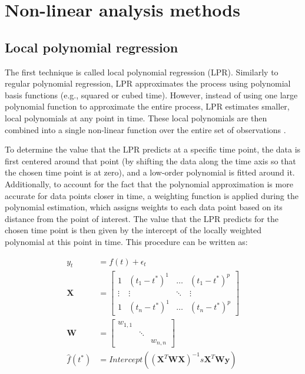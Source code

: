 \documentclass[man, floatsintext]{apa7}
\begin{document}
\section{Non-linear analysis methods}\label{method_introduction}

\subsection{Local polynomial regression}

The first technique is called local polynomial regression (LPR). Similarly to
regular polynomial regression, LPR approximates the process using polynomial
basis functions (e.g., squared or cubed time). However, instead of using one
large polynomial function to approximate the entire process, LPR estimates
smaller, local polynomials at any point in time. These local polynomials are
then combined into a single non-linear function over the entire set of
observations \parencite{fan_adaptive_1995, ruppert_multivariate_1994,
  fan_local_2018}.

To determine the value that the LPR predicts at a specific time point, the data
is first centered around that point (by shifting the data along the time axis
so that the chosen time point is at zero), and a low-order polynomial is fitted
around it. Additionally, to account for the fact that the polynomial
approximation is more accurate for data points closer in time, a weighting
function is applied during the polynomial estimation, which assigns weights to
each data point based on its distance from the point of interest. The value
that the LPR predicts for the chosen time point is then given by the intercept
of the locally weighted polynomial at this point in time. This procedure can be
written as:

\begin{equation} \label{eq:lpr_equations}
  \begin{aligned}
    y_t          & = f(t) + \epsilon_t                            \\
    \textbf{X}   & =
    \begin{bmatrix}
      1      & (t_1 - t^*)^1 & \dots  & (t_1 - t^*)^p \\
      \vdots & \vdots        & \ddots & \vdots        \\
      1      & (t_n - t^*)^1 & \dots  & (t_n - t^*)^p
    \end{bmatrix} \\
    \textbf{W}   & =
    \begin{bmatrix}
      w_{1, 1} &        &          \\
               & \ddots &          \\
               &        & w_{n, n}
    \end{bmatrix}                               \\
    \hat{f}(t^*) & =
    Intercept((\textbf{X}^T\textbf{WX})^{-1}s\textbf{X}^T\textbf{Wy})
  \end{aligned}
\end{equation}
\end{document}

